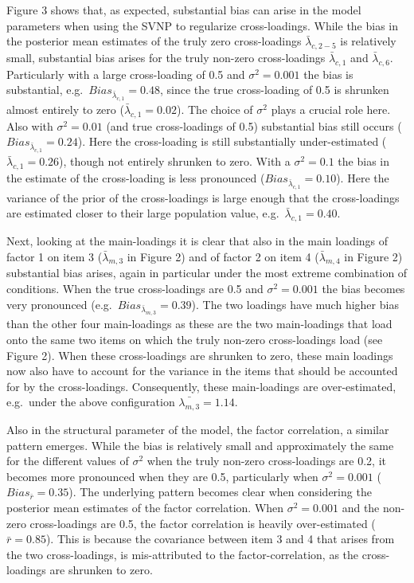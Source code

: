 \documentclass[
  man,floatsintext]{apa6}
\begin{document}
Figure 3 shows that, as expected, substantial bias can arise in the model parameters when using the SVNP to regularize cross-loadings. While the bias in the posterior mean estimates of the truly zero cross-loadings \(\bar{\lambda}_{c, 2-5}\) is relatively small, substantial bias arises for the truly non-zero cross-loadings \(\bar{\lambda}_{c, 1}\) and \(\bar{\lambda}_{c, 6}\). Particularly with a large cross-loading of 0.5 and \(\sigma^2 = 0.001\) the bias is substantial, e.g.~\(Bias_{\bar{\lambda}_{c, 1}} = 0.48\), since the true cross-loading of 0.5 is shrunken almost entirely to zero (\(\bar{\lambda}_{c, 1} = 0.02\)). The choice of \(\sigma^2\) plays a crucial role here. Also with \(\sigma^2 = 0.01\) (and true cross-loadings of 0.5) substantial bias still occurs (\(Bias_{\bar{\lambda}_{c, 1}} = 0.24\)). Here the cross-loading is still substantially under-estimated (\(\bar{\lambda}_{c, 1} = 0.26\)), though not entirely shrunken to zero. With a \(\sigma^2 = 0.1\) the bias in the estimate of the cross-loading is less pronounced (\(Bias_{\bar{\lambda}_{c, 1}} = 0.10\)). Here the variance of the prior of the cross-loadings is large enough that the cross-loadings are estimated closer to their large population value, e.g.~\(\bar{\lambda}_{c, 1} = 0.40\).

Next, looking at the main-loadings it is clear that also in the main loadings of factor 1 on item 3 (\(\bar{\lambda}_{m, 3}\) in Figure 2) and of factor 2 on item 4 (\(\bar{\lambda}_{m, 4}\) in Figure 2) substantial bias arises, again in particular under the most extreme combination of conditions. When the true cross-loadings are 0.5 and \(\sigma^2 = 0.001\) the bias becomes very pronounced (e.g.~\(Bias_{\bar{\lambda}_{m, 3}} = 0.39\)). The two loadings have much higher bias than the other four main-loadings as these are the two main-loadings that load onto the same two items on which the truly non-zero cross-loadings load (see Figure 2). When these cross-loadings are shrunken to zero, these main loadings now also have to account for the variance in the items that should be accounted for by the cross-loadings. Consequently, these main-loadings are over-estimated, e.g.~under the above configuration \(\bar{\lambda_{m, 3}} = 1.14\).

Also in the structural parameter of the model, the factor correlation, a similar pattern emerges. While the bias is relatively small and approximately the same for the different values of \(\sigma^2\) when the truly non-zero cross-loadings are 0.2, it becomes more pronounced when they are 0.5, particularly when \(\sigma^2 = 0.001\) (\(Bias_{\bar{r}} = 0.35\)). The underlying pattern becomes clear when considering the posterior mean estimates of the factor correlation. When \(\sigma^2 = 0.001\) and the non-zero cross-loadings are 0.5, the factor correlation is heavily over-estimated (\(\bar{r} = 0.85\)). This is because the covariance between item 3 and 4 that arises from the two cross-loadings, is mis-attributed to the factor-correlation, as the cross-loadings are shrunken to zero.
\end{document}
